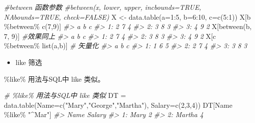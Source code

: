 \documentclass[
]{book}
\newenvironment{Shaded}{\begin{snugshade}}{\end{snugshade}}
\newcommand{\AttributeTok}[1]{\textcolor[rgb]{0.77,0.63,0.00}{#1}}
\newcommand{\CommentTok}[1]{\textcolor[rgb]{0.56,0.35,0.01}{\textit{#1}}}
\newcommand{\DecValTok}[1]{\textcolor[rgb]{0.00,0.00,0.81}{#1}}
\newcommand{\FunctionTok}[1]{\textcolor[rgb]{0.00,0.00,0.00}{#1}}
\newcommand{\NormalTok}[1]{#1}
\newcommand{\OtherTok}[1]{\textcolor[rgb]{0.56,0.35,0.01}{#1}}
\newcommand{\SpecialCharTok}[1]{\textcolor[rgb]{0.00,0.00,0.00}{#1}}
\newcommand{\StringTok}[1]{\textcolor[rgb]{0.31,0.60,0.02}{#1}}
\providecommand{\tightlist}{%
  \setlength{\itemsep}{0pt}\setlength{\parskip}{0pt}}
\begin{document}
\begin{Shaded}
\begin{Highlighting}[]
\CommentTok{\#between 函数参数}
\CommentTok{\#between(x, lower, upper, incbounds=TRUE, NAbounds=TRUE, check=FALSE)}
\NormalTok{X }\OtherTok{\textless{}{-}}  \FunctionTok{data.table}\NormalTok{(}\AttributeTok{a=}\DecValTok{1}\SpecialCharTok{:}\DecValTok{5}\NormalTok{, }\AttributeTok{b=}\DecValTok{6}\SpecialCharTok{:}\DecValTok{10}\NormalTok{, }\AttributeTok{c=}\FunctionTok{c}\NormalTok{(}\DecValTok{5}\SpecialCharTok{:}\DecValTok{1}\NormalTok{))}
\NormalTok{X[b }\SpecialCharTok{\%between\%} \FunctionTok{c}\NormalTok{(}\DecValTok{7}\NormalTok{,}\DecValTok{9}\NormalTok{)]}
\CommentTok{\#\textgreater{}    a b c}
\CommentTok{\#\textgreater{} 1: 2 7 4}
\CommentTok{\#\textgreater{} 2: 3 8 3}
\CommentTok{\#\textgreater{} 3: 4 9 2}
\NormalTok{X[}\FunctionTok{between}\NormalTok{(b, }\DecValTok{7}\NormalTok{, }\DecValTok{9}\NormalTok{)] }\CommentTok{\#效果同上}
\CommentTok{\#\textgreater{}    a b c}
\CommentTok{\#\textgreater{} 1: 2 7 4}
\CommentTok{\#\textgreater{} 2: 3 8 3}
\CommentTok{\#\textgreater{} 3: 4 9 2}
\NormalTok{X[c }\SpecialCharTok{\%between\%} \FunctionTok{list}\NormalTok{(a,b)] }\CommentTok{\# 矢量化}
\CommentTok{\#\textgreater{}    a b c}
\CommentTok{\#\textgreater{} 1: 1 6 5}
\CommentTok{\#\textgreater{} 2: 2 7 4}
\CommentTok{\#\textgreater{} 3: 3 8 3}
\end{Highlighting}
\end{Shaded}

\begin{itemize}
\tightlist
\item
  like 筛选
\end{itemize}

\%like\% 用法与SQL中 like 类似。

\begin{Shaded}
\begin{Highlighting}[]
\CommentTok{\# \%like\% 用法与SQL中 like 类似}
\NormalTok{DT }\OtherTok{=} \FunctionTok{data.table}\NormalTok{(}\AttributeTok{Name=}\FunctionTok{c}\NormalTok{(}\StringTok{"Mary"}\NormalTok{,}\StringTok{"George"}\NormalTok{,}\StringTok{"Martha"}\NormalTok{), }\AttributeTok{Salary=}\FunctionTok{c}\NormalTok{(}\DecValTok{2}\NormalTok{,}\DecValTok{3}\NormalTok{,}\DecValTok{4}\NormalTok{))}
\NormalTok{DT[Name }\SpecialCharTok{\%like\%} \StringTok{"\^{}Mar"}\NormalTok{]}
\CommentTok{\#\textgreater{}      Name Salary}
\CommentTok{\#\textgreater{} 1:   Mary      2}
\CommentTok{\#\textgreater{} 2: Martha      4}
\end{Highlighting}
\end{Shaded}
\end{document}
